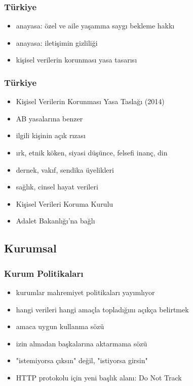 \documentclass[dvipsnames]{beamer}
\theoremstyle{plain}
\begin{document}
\begin{frame}
  \frametitle{Türkiye}

  \begin{itemize}
    \item anayasa: özel ve aile yaşamına saygı bekleme hakkı
    \item anayasa: iletişimin gizliliği
    \item kişisel verilerin korunması yasa tasarısı
  \end{itemize}
\end{frame}

\begin{frame}
  \frametitle{Türkiye}

  \begin{itemize}
    \item Kişisel Verilerin Korunması Yasa Taslağı (2014)
    \smallskip
    \item AB yasalarına benzer
    \item ilgili kişinin açık rızası

    \smallskip
    \item ırk, etnik köken, siyasi düşünce, felsefi inanç, din
    \item dernek, vakıf, sendika üyelikleri
    \item sağlık, cinsel hayat verileri

    \smallskip
    \item Kişisel Verileri Koruma Kurulu
    \item Adalet Bakanlığı'na bağlı
  \end{itemize}
\end{frame}

\subsection{Kurumsal}

\begin{frame}
  \frametitle{Kurum Politikaları}

  \begin{itemize}
    \item kurumlar mahremiyet politikaları yayımlıyor
    \item hangi verileri hangi amaçla topladığını açıkça belirtmek
    \item amaca uygun kullanma sözü
    \item izin almadan başkalarına aktarmama sözü

    \medskip
    \item "istemiyorsa çıksın" değil, "istiyorsa girsin"

    \medskip
    \item HTTP protokolu için yeni başlık alanı: Do Not Track
  \end{itemize}
\end{frame}
\end{document}
